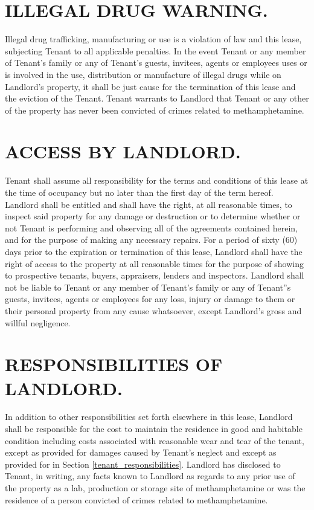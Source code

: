 \documentclass[9pt]{article}
\begin{document}
	\section{ILLEGAL DRUG WARNING.}
	Illegal drug trafficking, manufacturing or use is a violation of law and this lease, subjecting Tenant to all applicable penalties. In the event Tenant or any member of Tenant's family or any of Tenant's guests, invitees, agents or employees uses or is involved in the use, distribution or manufacture of illegal drugs while on Landlord's property, it shall be just cause for the termination of this lease and the eviction of the Tenant. Tenant warrants to Landlord that Tenant or any other of the property has never been convicted of crimes related to methamphetamine.
	
	\section{ACCESS BY LANDLORD.}
	Tenant shall assume all responsibility for the terms and conditions of this lease at the time of occupancy but no later than the first day of the term hereof. Landlord shall be entitled and shall have the right, at all reasonable times, to inspect said property for any damage or destruction or to determine whether or not Tenant is performing and observing all of the agreements contained herein, and for the purpose of making any necessary repairs. For a period of sixty (60) days prior to the expiration or termination of this lease, Landlord shall have the right of access to the property at all reasonable times for the purpose of showing to prospective tenants, buyers, appraisers, lenders and inspectors. Landlord shall not be liable to Tenant or any member of Tenant's family or any of Tenant''s guests, invitees, agents or employees for any loss, injury or damage to them or their personal property from any cause whatsoever, except Landlord's gross and willful negligence.
	
	\section{RESPONSIBILITIES OF LANDLORD.}
	In addition to other responsibilities set forth elsewhere in this lease, Landlord shall be responsible for the cost to maintain the residence in good and habitable condition including costs associated with reasonable wear and tear of the tenant, except as provided for damages caused by Tenant's neglect and except as provided for in Section \ref{tenant_responsibilities}. Landlord has disclosed to Tenant, in writing, any facts known to Landlord as regards to any prior use of the property as a lab, production or storage site of methamphetamine or was the residence of a person convicted of crimes related to methamphetamine.
	
\end{document}
